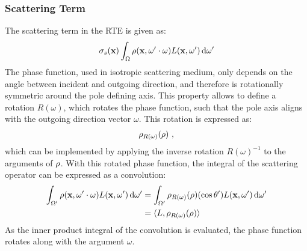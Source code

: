 \subsubsection*{Scattering Term}

The scattering term in the RTE is given as:
\begin{align*}
\sigma_s(\mathbf{x})\int_{\Omega}\rho(\mathbf{x}, \omega'\cdot\omega)L(\mathbf{x}, \omega')\,\mathrm{d}\omega'
\end{align*}
The phase function, used in isotropic scattering medium, only depends on the angle between incident and outgoing direction, and therefore is rotationally symmetric around the pole defining axis. This property allows to define a rotation $R(\omega)$, which rotates the phase function, such that the pole axis aligns with the outgoing direction vector $\omega$. This rotation is expressed as:
\begin{align*}
\rho_{R(\omega)}(\rho)
\ ,
\end{align*}
which can be implemented by applying the inverse rotation $R(\omega)^{-1}$ to the arguments of $\rho$. With this rotated phase function, the integral of the scattering operator can be expressed as a convolution:
\begin{align}
\int_{\Omega'}\rho(\mathbf{x}, \omega'\cdot\omega)L(\mathbf{x}, \omega')\,\mathrm{d}\omega'
&=
\int_{\Omega'}{\rho_{R(\omega)}(\rho)(\operatorname{cos}\theta')L(\mathbf{x}, \omega')\,\mathrm{d}\omega'}
\nonumber\\
&= \langle L,  \rho_{R(\omega)}(\rho)\rangle
\label{eq:complex_scatt_conv}
\end{align}
As the inner product integral of the convolution is evaluated, the phase function rotates along with the argument $\omega$.

